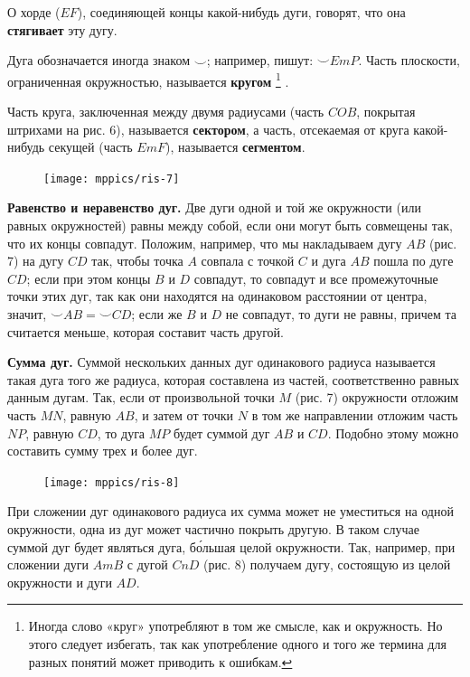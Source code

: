 \documentclass[oneside]{book}
\begin{document}
О хорде ($EF$), соединяющей концы какой-нибудь дуги, говорят, что она \textbf{стягивает} эту дугу.

Дуга обозначается иногда знаком $\smallsmile$;
например, пишут: ${\smallsmile} EmP$.
Часть плоскости, ограниченная окружностью, называется \textbf{кругом}%
\footnote{Иногда слово «круг» употребляют в том же смысле, как и окружность.
Но этого следует избегать, так как употребление одного и того же термина для разных понятий может приводить к ошибкам.}%
.

Часть круга, заключенная между двумя радиусами (часть $COB$, покрытая штрихами на рис. 6), называется \textbf{сектором}, а часть, отсекаемая от круга какой-нибудь секущей (часть $EmF$), называется \textbf{сегментом}.

\begin{figure}
\texttt{[image: mppics/ris-7]}
\caption{}
\end{figure}

\textbf{Равенство и неравенство дуг.}
Две дуги одной и той же окружности (или равных окружностей) равны между собой, если они могут быть совмещены так, что их концы совпадут.
Положим, например, что мы накладываем дугу $AB$ (рис. 7) на дугу $CD$ так, чтобы точка $A$ совпала с точкой $C$ и дуга $AB$ пошла по дуге $CD$;
если при этом концы $B$ и $D$ совпадут, то совпадут и все промежуточные точки этих дуг, так как они находятся на одинаковом расстоянии от центра, значит, ${\smallsmile} AB={\smallsmile} CD$;
если же $B$ и $D$ не совпадут, то дуги не равны, причем та считается меньше, которая составит часть другой.

\textbf{Сумма дуг.}
Суммой нескольких данных дуг одинакового радиуса называется такая дуга того же радиуса, которая составлена из частей, соответственно равных данным дугам.
Так, если от произвольной точки $M$ (рис. 7) окружности отложим часть $MN$, равную $AB$, и затем от точки $N$ в том же направлении отложим часть $NP$, равную $CD$, то дуга $MP$ будет суммой дуг $AB$ и $CD$.
Подобно этому можно составить сумму трех и более дуг.

\begin{figure}[h!]
\begin{center}
\texttt{[image: mppics/ris-8]}
\caption{}
\end{center}
\end{figure}

При сложении дуг одинакового радиуса их сумма может не уместиться на одной окружности, одна из дуг может частично покрыть другую.
В таком случае суммой дуг будет являться дуга, б\'{о}льшая целой окружности.
Так, например, при сложении дуги $AmB$ с дугой $CnD$ (рис. 8) получаем дугу, состоящую из целой окружности и дуги $AD$.
\end{document}
